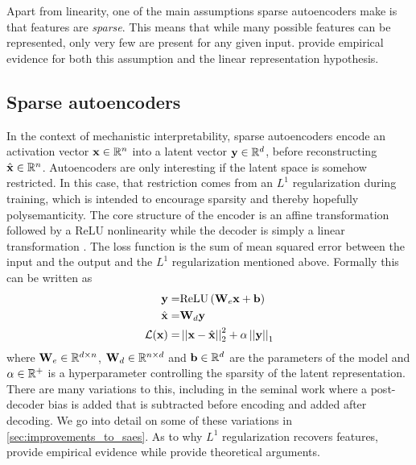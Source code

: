 \documentclass[../../main.tex]{subfiles}
\begin{document}
Apart from linearity, one of the main assumptions sparse autoencoders make is that features are \emph{sparse}.
This means that while many possible features can be represented, only very few are present for any given input.
\citet{deng_measuring_2023} provide empirical evidence for both this assumption and the linear representation hypothesis.

\subsection{Sparse autoencoders}
In the context of mechanistic interpretability, sparse autoencoders encode an activation vector $\mathbf{x}\in\mathbb{R}^{n}$ into a latent vector $\mathbf{y}\in\mathbb{R}^d$, before reconstructing $\hat{\mathbf{x}}\in\mathbb{R}^n$.
Autoencoders are only interesting if the latent space is somehow restricted.
In this case, that restriction comes from an $L^1$ regularization during training, which is intended to encourage sparsity and thereby hopefully polysemanticity.
The core structure of the encoder is an affine transformation followed by a ReLU nonlinearity while the decoder is simply a linear transformation \citep{cunningham_sparse_2023}.
The loss function is the sum of mean squared error between the input and the output and the $L^1$ regularization mentioned above.
Formally this can be written as
\begin{align*}
    \mathbf{y}=&\mathrm{ReLU}\left(\mathbf{W}_e\mathbf{x}+\mathbf{b}\right)\\
    \hat{\mathbf{x}}=&\mathbf{W}_d\mathbf{y}\\
    \mathcal L(\mathbf{x})=&\left\lvert\left\lvert\mathbf{x}-\hat{\mathbf{x}}\right\lvert\right\lvert_2^2+\alpha\left\lvert\left\lvert\mathbf{y}\right\lvert\right\lvert_1
\end{align*}
where $\mathbf{W}_e\in\mathbb{R}^{d\times n}$, $\mathbf{W}_d\in\mathbb{R}^{n\times d}$ and $\mathbf{b}\in\mathbb{R}^d$ are the parameters of the model and $\alpha\in\mathbb{R}^+$ is a hyperparameter controlling the sparsity of the latent representation.
There are many variations to this, including in the seminal work \citet{bricken_towards_2023} where a post-decoder bias is added that is subtracted before encoding and added after decoding.
We go into detail on some of these variations in \ref{sec:improvements_to_saes}.
As to why $L^1$ regularization recovers features, \citet{sharkey_interim_2022} provide empirical evidence while \citet{wright_high-dimensional_2022} provide theoretical arguments.
\end{document}
